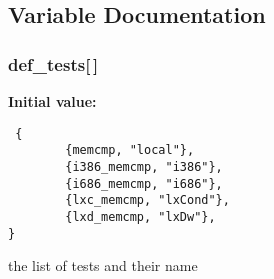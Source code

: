 \subsection{Variable Documentation}
\subsubsection{ def\_\-tests[$\,$]}\label{memcmp_2def__test_8h_a5}


{\bf Initial value:}

\footnotesize\begin{verbatim} {
        {memcmp, "local"},
        {i386_memcmp, "i386"},
        {i686_memcmp, "i686"},
        {lxc_memcmp, "lxCond"},
        {lxd_memcmp, "lxDw"},
}\end{verbatim}\normalsize 
the list of tests and their name 